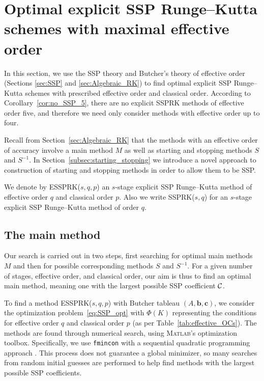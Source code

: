 \section{Optimal explicit SSP Runge--Kutta schemes with maximal effective order}\label{sec:optimal_ESSPRK}
In this section, we use the SSP theory and Butcher's theory of effective
order (Sections \ref{sec:SSP} and \ref{sec:Algebraic_RK}) to find
optimal explicit SSP Runge--Kutta schemes with prescribed effective
order and classical order.
According to Corollary~\ref{cor:no_SSP_5}, there are no explicit SSPRK methods of
effective order five, and therefore we need only consider methods with
effective order up to four.

Recall from Section~\ref{sec:Algebraic_RK} that the methods with
an effective order of accuracy involve a main method $M$ as well as starting and
stopping methods $S$ and $S^{-1}$.
In Section~\ref{subsec:starting_stopping} we introduce a novel approach
to construction of starting and stopping methods in order to allow
them to be SSP.

We denote by ESSPRK($s,q,p$) an $s$-stage explicit SSP Runge--Kutta
method of effective order $q$ and classical order $p$.
Also we write SSPRK($s,q$) for an $s$-stage explicit SSP Runge--Kutta
method of order $q$.

\subsection{The main method}\label{subsec:main_method}

Our search is carried out in two
steps, first searching for optimal main methods $M$ and then for
possible corresponding methods $S$ and $S^{-1}$.
For a given number of stages, effective order, and classical order,
our aim is thus to find an optimal main method, meaning one with the 
largest possible SSP coefficient $\mathcal{C}$.

To find a method ESSPRK($s,q,p$) with Butcher tableau $(A, \bm{b},
\bm{c})$, we consider the optimization problem~\eqref{eq:SSP_opt} 
with $\Phi(K)$ representing the conditions for effective order
$q$ and classical order $p$ (as per Table~\ref{tab:effective_OCs}).
The methods are found through numerical search, using 
\textsc{Matlab}'s optimization toolbox.
Specifically, we use \texttt{fmincon} with a sequential quadratic 
programming approach \cite{Ketcheson2008, Ketcheson/Macdonald/Gottlieb:2009}.
This process does not guarantee a global minimizer, so many searches 
from random initial guesses are performed to help
find methods with the largest possible SSP coefficients.



